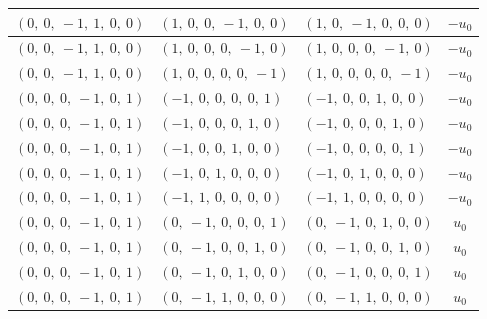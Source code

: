 \documentclass[11pt]{article}
\theoremstyle{definition}
\begin{document}
\begin{longtable}{|l|l|l|c|}
    \hline
    $\left( 0, \  0, \  -1, \  1, \  0, \  0\right)$ & $\left( 1, \  0, \  0, \  -1, \  0, \  0\right)$ & $\left( 1, \  0, \  -1, \  0, \  0, \  0\right)$ & $- u_{0}$ \\
    \hline
    $\left( 0, \  0, \  -1, \  1, \  0, \  0\right)$ & $\left( 1, \  0, \  0, \  0, \  -1, \  0\right)$ & $\left( 1, \  0, \  0, \  0, \  -1, \  0\right)$ & $- u_{0}$ \\
    \hline
    $\left( 0, \  0, \  -1, \  1, \  0, \  0\right)$ & $\left( 1, \  0, \  0, \  0, \  0, \  -1\right)$ & $\left( 1, \  0, \  0, \  0, \  0, \  -1\right)$ & $- u_{0}$ \\
    \hline
    $\left( 0, \  0, \  0, \  -1, \  0, \  1\right)$ & $\left( -1, \  0, \  0, \  0, \  0, \  1\right)$ & $\left( -1, \  0, \  0, \  1, \  0, \  0\right)$ & $- u_{0}$ \\
    \hline
    $\left( 0, \  0, \  0, \  -1, \  0, \  1\right)$ & $\left( -1, \  0, \  0, \  0, \  1, \  0\right)$ & $\left( -1, \  0, \  0, \  0, \  1, \  0\right)$ & $- u_{0}$ \\
    \hline
    $\left( 0, \  0, \  0, \  -1, \  0, \  1\right)$ & $\left( -1, \  0, \  0, \  1, \  0, \  0\right)$ & $\left( -1, \  0, \  0, \  0, \  0, \  1\right)$ & $- u_{0}$ \\
    \hline
    $\left( 0, \  0, \  0, \  -1, \  0, \  1\right)$ & $\left( -1, \  0, \  1, \  0, \  0, \  0\right)$ & $\left( -1, \  0, \  1, \  0, \  0, \  0\right)$ & $- u_{0}$ \\
    \hline
    $\left( 0, \  0, \  0, \  -1, \  0, \  1\right)$ & $\left( -1, \  1, \  0, \  0, \  0, \  0\right)$ & $\left( -1, \  1, \  0, \  0, \  0, \  0\right)$ & $- u_{0}$ \\
    \hline
    $\left( 0, \  0, \  0, \  -1, \  0, \  1\right)$ & $\left( 0, \  -1, \  0, \  0, \  0, \  1\right)$ & $\left( 0, \  -1, \  0, \  1, \  0, \  0\right)$ & $u_{0}$ \\
    \hline
    $\left( 0, \  0, \  0, \  -1, \  0, \  1\right)$ & $\left( 0, \  -1, \  0, \  0, \  1, \  0\right)$ & $\left( 0, \  -1, \  0, \  0, \  1, \  0\right)$ & $u_{0}$ \\
    \hline
    $\left( 0, \  0, \  0, \  -1, \  0, \  1\right)$ & $\left( 0, \  -1, \  0, \  1, \  0, \  0\right)$ & $\left( 0, \  -1, \  0, \  0, \  0, \  1\right)$ & $u_{0}$ \\
    \hline
    $\left( 0, \  0, \  0, \  -1, \  0, \  1\right)$ & $\left( 0, \  -1, \  1, \  0, \  0, \  0\right)$ & $\left( 0, \  -1, \  1, \  0, \  0, \  0\right)$ & $u_{0}$ \\

\end{longtable}
\end{document}
